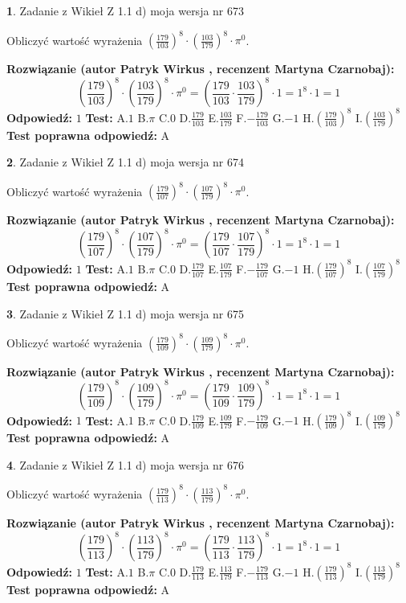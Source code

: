 \documentclass[12pt, a4paper]{article}
\theoremstyle{definition} %
\newtheorem{zad}{}
\newcommand{\zadStart}[1]{\begin{zad}#1\newline}
\newcommand{\zadStop}{\end{zad}}
\newcommand{\rozwStart}[2]{\noindent \textbf{Rozwiązanie (autor #1 , recenzent #2): }\newline}
\newcommand{\rozwStop}{\newline}
\newcommand{\odpStart}{\noindent \textbf{Odpowiedź:}\newline}
\newcommand{\odpStop}{\newline}
\newcommand{\testStart}{\noindent \textbf{Test:}\newline}
\newcommand{\testStop}{\newline}
\newcommand{\kluczStart}{\noindent \textbf{Test poprawna odpowiedź:}\newline}
\newcommand{\kluczStop}{\newline}
\begin{document}
\zadStart{Zadanie z Wikieł Z 1.1 d) moja wersja nr 673}

Obliczyć wartość wyrażenia $(\frac{179}{103})^{8} \cdot (\frac{103}{179})^{8} \cdot \pi^{0}$.
\zadStop
\rozwStart{Patryk Wirkus}{Martyna Czarnobaj}
$$(\frac{179}{103})^{8} \cdot (\frac{103}{179})^{8} \cdot \pi^{0} = (\frac{179}{103} \cdot \frac{103}{179})^{8} \cdot 1 = 1^{8} \cdot 1 = 1$$
\rozwStop
\odpStart
$1$
\odpStop
\testStart
A.$1$ B.$\pi$ C.$0$ D.$\frac{179}{103}$ E.$\frac{103}{179}$
F.$-\frac{179}{103}$ G.$-1$
H.$(\frac{179}{103})^{8}$
I.$(\frac{103}{179})^{8}$
\testStop
\kluczStart
A
\kluczStop



\zadStart{Zadanie z Wikieł Z 1.1 d) moja wersja nr 674}

Obliczyć wartość wyrażenia $(\frac{179}{107})^{8} \cdot (\frac{107}{179})^{8} \cdot \pi^{0}$.
\zadStop
\rozwStart{Patryk Wirkus}{Martyna Czarnobaj}
$$(\frac{179}{107})^{8} \cdot (\frac{107}{179})^{8} \cdot \pi^{0} = (\frac{179}{107} \cdot \frac{107}{179})^{8} \cdot 1 = 1^{8} \cdot 1 = 1$$
\rozwStop
\odpStart
$1$
\odpStop
\testStart
A.$1$ B.$\pi$ C.$0$ D.$\frac{179}{107}$ E.$\frac{107}{179}$
F.$-\frac{179}{107}$ G.$-1$
H.$(\frac{179}{107})^{8}$
I.$(\frac{107}{179})^{8}$
\testStop
\kluczStart
A
\kluczStop



\zadStart{Zadanie z Wikieł Z 1.1 d) moja wersja nr 675}

Obliczyć wartość wyrażenia $(\frac{179}{109})^{8} \cdot (\frac{109}{179})^{8} \cdot \pi^{0}$.
\zadStop
\rozwStart{Patryk Wirkus}{Martyna Czarnobaj}
$$(\frac{179}{109})^{8} \cdot (\frac{109}{179})^{8} \cdot \pi^{0} = (\frac{179}{109} \cdot \frac{109}{179})^{8} \cdot 1 = 1^{8} \cdot 1 = 1$$
\rozwStop
\odpStart
$1$
\odpStop
\testStart
A.$1$ B.$\pi$ C.$0$ D.$\frac{179}{109}$ E.$\frac{109}{179}$
F.$-\frac{179}{109}$ G.$-1$
H.$(\frac{179}{109})^{8}$
I.$(\frac{109}{179})^{8}$
\testStop
\kluczStart
A
\kluczStop



\zadStart{Zadanie z Wikieł Z 1.1 d) moja wersja nr 676}

Obliczyć wartość wyrażenia $(\frac{179}{113})^{8} \cdot (\frac{113}{179})^{8} \cdot \pi^{0}$.
\zadStop
\rozwStart{Patryk Wirkus}{Martyna Czarnobaj}
$$(\frac{179}{113})^{8} \cdot (\frac{113}{179})^{8} \cdot \pi^{0} = (\frac{179}{113} \cdot \frac{113}{179})^{8} \cdot 1 = 1^{8} \cdot 1 = 1$$
\rozwStop
\odpStart
$1$
\odpStop
\testStart
A.$1$ B.$\pi$ C.$0$ D.$\frac{179}{113}$ E.$\frac{113}{179}$
F.$-\frac{179}{113}$ G.$-1$
H.$(\frac{179}{113})^{8}$
I.$(\frac{113}{179})^{8}$
\testStop
\kluczStart
A
\kluczStop
\end{document}
